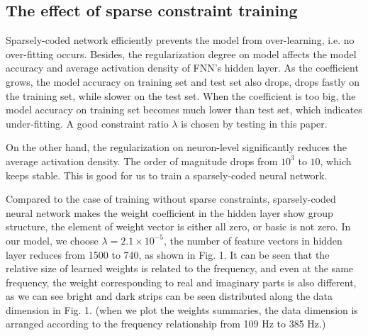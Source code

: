 \subsection{The effect of sparse constraint training}
Sparsely-coded network efficiently prevents the model from over-learning, i.e. no over-fitting occurs.
Besides, the regularization degree on model affects the model accuracy and average activation density of FNN's hidden layer. As the coefficient grows, the model accuracy on training set and test set also drops, drops fastly on the training set, while slower on the test set. When the coefficient is too big, the model accuracy on training set becomes much lower than test set, which indicates under-fitting.
A good constraint ratio $\lambda$ is chosen by testing in this paper.

On the other hand, the regularization on neuron-level significantly reduces the average activation density.
The order of magnitude drops from $10^{3}$ to $10$, which keeps stable. This is good for us to train a sparsely-coded neural network.

Compared to the case of training without sparse constraints, sparsely-coded neural network makes the weight coefficient in the hidden layer show group structure, the element of weight vector is either all zero, or basic is not zero.
In our model, we choose $\lambda=2.1 \times 10^{-5} $, the number of feature vectors in hidden layer reduces from 1500 to 740, as shown in Fig. 1. It can be seen that the relative size of learned weights is related to the frequency, and even at the same frequency, the weight corresponding
to real and imaginary parts is also different, as we can see bright and dark strips can be seen distributed along the data dimension in Fig. 1. (when we plot the weights summaries, the data dimension is arranged according to the frequency relationship from 109 Hz to 385 Hz.)

